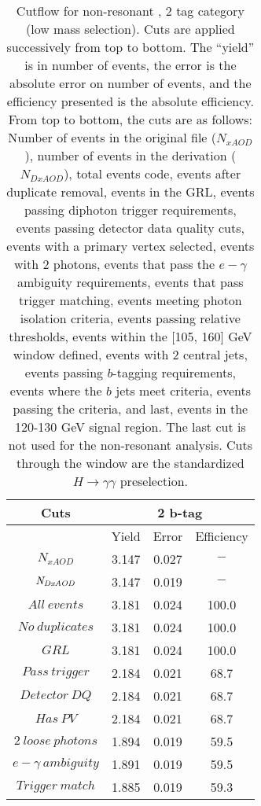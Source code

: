 \begin{table}\footnotesize
\begin{center}
\caption[Cutflow for non-resonant \hhyybb, 2 tag category (low mass selection)]{Cutflow for non-resonant \hhyybb, 2 tag category (low mass selection). Cuts are applied successively from top to bottom. The ``yield'' is in number of events, the error is the absolute error on number of events, and the efficiency presented is the absolute efficiency. From top to bottom, the cuts are as follows: Number of events in the original file ($N_{xAOD}$), number of events in the derivation ($N_{DxAOD}$), total events code, events after duplicate removal, events in the \gls{GRL}, events passing diphoton trigger requirements, events passing detector data quality cuts, events with a primary vertex selected, events with 2 photons, events that pass the $e-\gamma$ ambiguity requirements, events that pass trigger matching, events meeting photon isolation criteria, events passing relative \pt thresholds, events within the [105, 160] GeV \myy window defined, events with 2 central jets, events passing $b$-tagging requirements, events where the $b$ jets meet criteria, events passing the \mbb criteria, and last, events in the 120-130 GeV \yy signal region. The last cut is not used for the non-resonant analysis. Cuts through the \myy window are the standardized $H \rightarrow \gamma \gamma$ preselection.}
\label{tab:cutflow-nonres-2tag-low}
\begin{tabular}{|c|c|c|c|}
 \hline
Cuts& \multicolumn{3}{c|}{2 b-tag} \\ \hline
 &Yield&Error&Efficiency\\ \hline
$N_{xAOD}$ & 3.147&0.027 &$-$ \\
 \hline
$\it{N}_{DxAOD}$ & 3.147&0.019 &$-$ \\
 \hline
$All\ events$ & 3.181&0.024 &100.0 \\
 \hline
$No\ duplicates$ & 3.181&0.024 &100.0 \\
 \hline
$GRL$ & 3.181&0.024 &100.0 \\
 \hline
$Pass\ trigger$ & 2.184&0.021 &68.7 \\
 \hline
$Detector\ DQ$ & 2.184&0.021 &68.7 \\
 \hline
$Has\ PV$ & 2.184&0.021 &68.7 \\
 \hline
$2\ loose\ photons$ & 1.894&0.019 &59.5 \\
 \hline
$e-\gamma\ ambiguity$ & 1.891&0.019 &59.5 \\
 \hline
$Trigger\ match$ & 1.885&0.019 &59.3 \\

\end{tabular}
\end{center}
\end{table}
